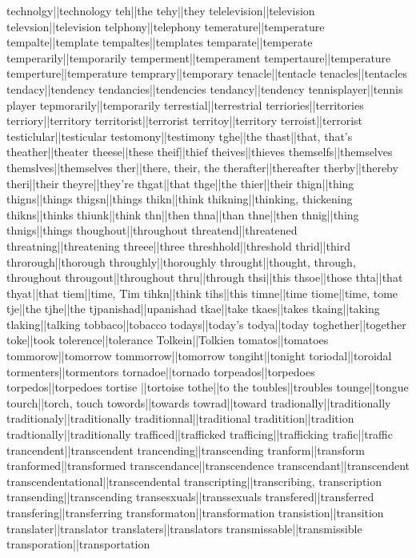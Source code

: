 technolgy||technology
teh||the
tehy||they
telelevision||television
televsion||television
telphony||telephony
temerature||temperature
tempalte||template
tempaltes||templates
temparate||temperate
temperarily||temporarily
temperment||temperament
tempertaure||temperature
temperture||temperature
temprary||temporary
tenacle||tentacle
tenacles||tentacles
tendacy||tendency
tendancies||tendencies
tendancy||tendency
tennisplayer||tennis player
tepmorarily||temporarily
terrestial||terrestrial
terriories||territories
terriory||territory
territorist||terrorist
territoy||territory
terroist||terrorist
testiclular||testicular
testomony||testimony
tghe||the
thast||that, that's
theather||theater
theese||these
theif||thief
theives||thieves
themselfs||themselves
themslves||themselves
ther||there, their, the
therafter||thereafter
therby||thereby
theri||their
theyre||they're
thgat||that
thge||the
thier||their
thign||thing
thigns||things
thigsn||things
thikn||think
thikning||thinking, thickening
thikns||thinks
thiunk||think
thn||then
thna||than
thne||then
thnig||thing
thnigs||things
thoughout||throughout
threatend||threatened
threatning||threatening
threee||three
threshhold||threshold
thrid||third
throrough||thorough
throughly||thoroughly
throught||thought, through, throughout
througout||throughout
thru||through
thsi||this
thsoe||those
thta||that
thyat||that
tiem||time, Tim
tihkn||think
tihs||this
timne||time
tiome||time, tome
tje||the
tjhe||the
tjpanishad||upanishad
tkae||take
tkaes||takes
tkaing||taking
tlaking||talking
tobbaco||tobacco
todays||today's
todya||today
toghether||together
toke||took
tolerence||tolerance
Tolkein||Tolkien
tomatos||tomatoes
tommorow||tomorrow
tommorrow||tomorrow
tongiht||tonight
toriodal||toroidal
tormenters||tormentors
tornadoe||tornado
torpeados||torpedoes
torpedos||torpedoes
tortise ||tortoise
tothe||to the
toubles||troubles
tounge||tongue
tourch||torch, touch
towords||towards
towrad||toward
tradionally||traditionally
traditionaly||traditionally
traditionnal||traditional
traditition||tradition
tradtionally||traditionally
trafficed||trafficked
trafficing||trafficking
trafic||traffic
trancendent||transcendent
trancending||transcending
tranform||transform
tranformed||transformed
transcendance||transcendence
transcendant||transcendent
transcendentational||transcendental
transcripting||transcribing, transcription
transending||transcending
transesxuals||transsexuals
transfered||transferred
transfering||transferring
transformaton||transformation
transistion||transition
translater||translator
translaters||translators
transmissable||transmissible
transporation||transportation
